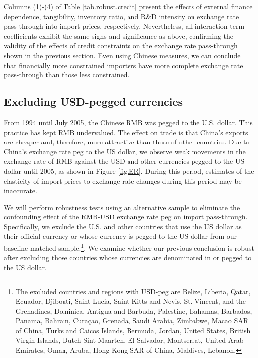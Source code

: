 Columns (1)-(4) of Table \ref{tab.robust.credit} present the effects of external finance dependence, tangibility, inventory ratio, and R\&D intensity on exchange rate pass-through into import prices, respectively. Nevertheless, all interaction term coefficients exhibit the same signs and significance as above, confirming the validity of the effects of credit constraints on the exchange rate pass-through shown in the previous section. Even using Chinese measures, we can conclude that financially more constrained importers have more complete exchange rate pass-through than those less constrained.

\subsection{Excluding USD-pegged currencies}

From 1994 until July 2005, the Chinese RMB was pegged to the U.S. dollar. This practice has kept RMB undervalued. The effect on trade is that China's exports are cheaper and, therefore, more attractive than those of other countries. Due to China's exchange rate peg to the US dollar, we observe weak movements in the exchange rate of RMB against the USD and other currencies pegged to the US dollar until 2005, as shown in Figure \ref{fig.ER}. During this period, estimates of the elasticity of import prices to exchange rate changes during this period may be inaccurate.

We will perform robustness tests using an alternative sample to eliminate the confounding effect of the RMB-USD exchange rate peg on import pass-through. Specifically, we exclude the U.S. and other countries that use the US dollar as their official currency or whose currency is pegged to the US dollar from our baseline matched sample.\footnote{The excluded countries and regions with USD-peg are Belize, Liberia, Qatar, Ecuador, Djibouti, Saint Lucia, Saint Kitts and Nevis, St. Vincent, and the Grenadines, Dominica, Antigua and Barbuda, Palestine, Bahamas, Barbados, Panama, Bahrain, Curaçao, Grenada, Saudi Arabia, Zimbabwe, Macao SAR of China, Turks and Caicos Islands, Bermuda, Jordan, United States, British Virgin Islands, Dutch Sint Maarten, El Salvador, Montserrat, United Arab Emirates, Oman, Aruba, Hong Kong SAR of China, Maldives, Lebanon.}. We examine whether our previous conclusion is robust after excluding those countries whose currencies are denominated in or pegged to the US dollar.

